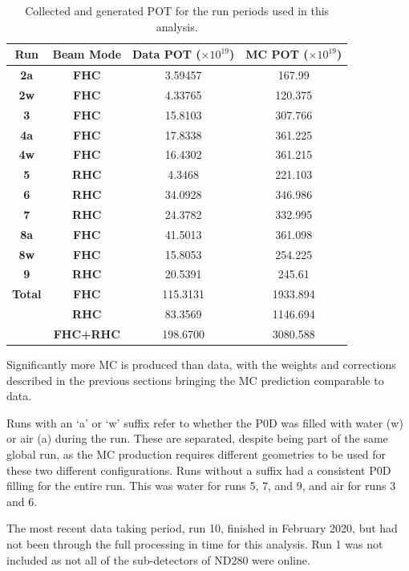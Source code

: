 \begin{center}
\begin{table}
\center
\large
\begin{tabular}{ c|c||c|c}
\hline
\hline
\textbf{Run} & \textbf{Beam Mode} & \textbf{Data POT ($\times10^{19}$)} & \textbf{MC POT ($\times10^{19}$)} \\
\hline
\hline
\textbf{2a} & \textbf{FHC} & 3.59457 & 167.99 \\
\textbf{2w} & \textbf{FHC} & 4.33765 & 120.375 \\
\hline
\textbf{3} & \textbf{FHC} & 15.8103 & 307.766 \\
\hline
\textbf{4a} & \textbf{FHC} & 17.8338 & 361.225 \\
\textbf{4w} & \textbf{FHC} & 16.4302 & 361.215 \\
\hline
\textbf{5} & \textbf{RHC} & 4.3468 & 221.103 \\
\hline
\textbf{6} & \textbf{RHC} & 34.0928 & 346.986 \\
\hline
\textbf{7} & \textbf{RHC} & 24.3782 & 332.995 \\
\hline
\textbf{8a} & \textbf{FHC} & 41.5013 & 361.098 \\
\textbf{8w} & \textbf{FHC} & 15.8053 & 254.225 \\
\hline
\textbf{9} & \textbf{RHC} & 20.5391 & 245.61 \\
\hline \hline
\textbf{Total} & \textbf{FHC}  & 115.3131 & 1933.894 \\ 
& \textbf{RHC} & 83.3569 & 1146.694 \\
& \textbf{FHC+RHC}  & 198.6700  & 3080.588 \\
\hline
\hline

\end{tabular}
\caption{Collected and generated POT for the run periods used in this analysis.}
\label{tab:pot}
\end{table}
\end{center}

Significantly more MC is produced than data, with the weights and corrections described in the previous sections bringing the MC prediction comparable to data. 

Runs with an `a' or `w' suffix refer to whether the P0D was filled with water (w) or air (a) during the run. These are separated, despite being part of the same global run, as the MC production requires different geometries to be used for these two different configurations. Runs without a suffix had a consistent P0D filling for the entire run. This was water for runs 5, 7, and 9, and air for runs 3 and 6.

The most recent data taking period, run 10, finished in February 2020, but had not been through the full processing in time for this analysis. Run 1 was not included as not all of the sub-detectors of ND280 were online.

\newpage

